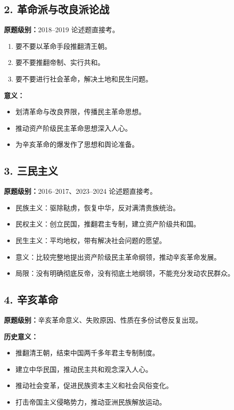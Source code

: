 \documentclass[UTF8,zihao=-4]{ctexart}
\newcommand{\exam}[1]{\textcolor{accent}{\bfseries 原题级别：}#1}
\begin{document}
\subsection{2. 革命派与改良派论战}
\exam{2018--2019 论述题直接考。}
\begin{enumerate}
  \item 要不要以革命手段推翻清王朝。
  \item 要不要推翻帝制、实行共和。
  \item 要不要进行社会革命，解决土地和民生问题。
\end{enumerate}

\textbf{意义：}
\begin{itemize}
  \item 划清革命与改良界限，传播民主革命思想。
  \item 推动资产阶级民主革命思想深入人心。
  \item 为辛亥革命的爆发作了思想和舆论准备。
\end{itemize}

\subsection{3. 三民主义}
\exam{2016--2017、2023--2024 论述题直接考。}
\begin{itemize}
  \item 民族主义：驱除鞑虏，恢复中华，反对满清贵族统治。
  \item 民权主义：创立民国，推翻君主专制，建立资产阶级共和国。
  \item 民生主义：平均地权，带有解决社会问题的愿望。
  \item 意义：比较完整地提出资产阶级民主革命纲领，推动辛亥革命发展。
  \item 局限：没有明确彻底反帝，没有彻底土地纲领，不能充分发动农民群众。
\end{itemize}

\subsection{4. 辛亥革命}
\exam{辛亥革命意义、失败原因、性质在多份试卷反复出现。}

\textbf{历史意义：}
\begin{itemize}
  \item 推翻清王朝，结束中国两千多年君主专制制度。
  \item 建立中华民国，推动民主共和观念深入人心。
  \item 推动社会变革，促进民族资本主义和社会风俗变化。
  \item 打击帝国主义侵略势力，推动亚洲民族解放运动。
\end{itemize}
\end{document}
